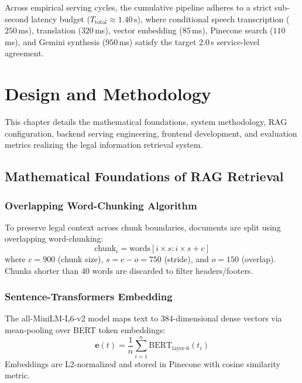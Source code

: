 \documentclass[12pt,a4paper]{report}
\begin{document}
\noindent Across empirical serving cycles, the cumulative pipeline adheres to a strict sub-second latency budget ($T_{\text{total}} \approx 1.40\,\text{s}$), where conditional speech transcription ($250$\,ms), translation ($320$\,ms), vector embedding ($85$\,ms), Pinecone search ($110$\,ms), and Gemini synthesis ($950$\,ms) satisfy the target 2.0\,s service-level agreement.



\chapter{Design and Methodology}

This chapter details the mathematical foundations, system methodology, RAG configuration, backend serving engineering, frontend development, and evaluation metrics realizing the legal information retrieval system.

\section{Mathematical Foundations of RAG Retrieval}

\subsection{Overlapping Word-Chunking Algorithm}
To preserve legal context across chunk boundaries, documents are split using overlapping word-chunking:
\begin{equation}
    \text{chunk}_i = \text{words}[i \times s : i \times s + c]
\end{equation}
where $c = 900$ (chunk size), $s = c - o = 750$ (stride), and $o = 150$ (overlap). Chunks shorter than 40 words are discarded to filter headers/footers.

\subsection{Sentence-Transformers Embedding}
The all-MiniLM-L6-v2 model maps text to 384-dimensional dense vectors via mean-pooling over BERT token embeddings:
\begin{equation}
    \mathbf{e}(t) = \frac{1}{n} \sum_{i=1}^n \text{BERT}_{\text{layer-6}}(t_i)
\end{equation}
Embeddings are L2-normalized and stored in Pinecone with cosine similarity metric.
\end{document}
